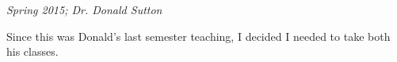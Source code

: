 \textit{Spring 2015; Dr. Donald Sutton}

Since this was Donald's last semester teaching, I decided I needed to take both
his classes.



\groupendnotes

